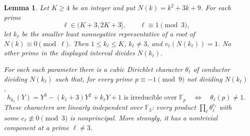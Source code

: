 \documentclass[11pt]{article}
\newtheorem{lemma}[theorem]{Lemma}
\theoremstyle{definition}
\theoremstyle{remark}
\begin{document}
\begin{lemma}\label{lem:tate-private-prime-menu}
Let $K\ge4$ be an integer and put $N(k)=k^2+3k+9$.
For each prime
\[
 \ell\in(K+3,2K+3],\qquad \ell\equiv1\pmod3,
\]
let $k_\ell$ be the smaller least nonnegative representative of a
root of $N(k)\equiv0\pmod\ell$.  Then $1\le k_\ell\le K$,
$k_\ell\ne3$, and $v_\ell(N(k_\ell))=1$.
No other prime in the displayed interval divides $N(k_\ell)$.

For each such parameter there is a cubic Dirichlet character
$\theta_\ell$ of conductor dividing $N(k_\ell)$ such that, for
every prime $p\equiv-1\pmod9$ not dividing $N(k_\ell)$,
\[
 h_{k_\ell}(Y)=Y^3-(k_\ell+3)Y^2+k_\ell Y+1
 \text{ is irreducible over }\mathbb F_p
 \quad\Longleftrightarrow\quad \theta_\ell(p)\ne1.
\]
These characters are linearly independent over $\mathbb F_3$:
every product $\prod_\ell\theta_\ell^{e_\ell}$ with some
$e_\ell\not\equiv0\pmod3$ is nonprincipal.  More strongly,
it has a nontrivial component at a prime $\ell\ne3$.
\end{lemma}
\end{document}
